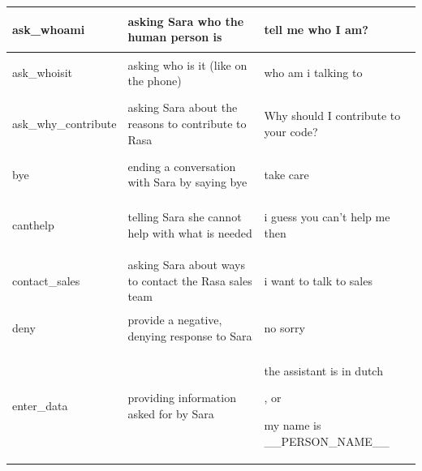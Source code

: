 \documentclass[bsc,frontabs,singlespacing,parskip,deptreport]{infthesis}
\begin{document}
{\begin{center}
\begin{longtable}{p{}|p{}|p{}}
    \hline
    \begin{spverbatim}ask_whoami\end{spverbatim} & asking Sara who the human person is & \begin{spverbatim}tell me who I am?\end{spverbatim} \\
    \hline
    \begin{spverbatim}ask_whoisit\end{spverbatim} & asking who is it (like on the phone) & \begin{spverbatim}who am i talking to\end{spverbatim} \\
    \hline
    \begin{spverbatim}ask_why_contribute\end{spverbatim} & asking Sara about the reasons to contribute to Rasa & \begin{spverbatim}Why should I contribute to your code?\end{spverbatim} \\
    \hline
    \begin{spverbatim}bye\end{spverbatim} & ending a conversation with Sara by saying bye & \begin{spverbatim}take care\end{spverbatim} \\
    \hline
    \begin{spverbatim}canthelp\end{spverbatim} & telling Sara she cannot help with what is needed & \begin{spverbatim}i guess you can't help me then\end{spverbatim} \\
    \hline
    \begin{spverbatim}contact_sales\end{spverbatim} & asking Sara about ways to contact the Rasa sales team & \begin{spverbatim}i want to talk to sales\end{spverbatim} \\
    \hline
    \begin{spverbatim}deny\end{spverbatim} & provide a negative, denying response to Sara & \begin{spverbatim}no sorry\end{spverbatim} \\
    \hline
    \begin{spverbatim}enter_data\end{spverbatim} & providing information asked for by Sara & \begin{spverbatim}the assistant is in dutch\end{spverbatim}, or \begin{spverbatim}my name is __PERSON_NAME__\end{spverbatim} \\

\end{longtable}
\end{center}}
\end{document}

